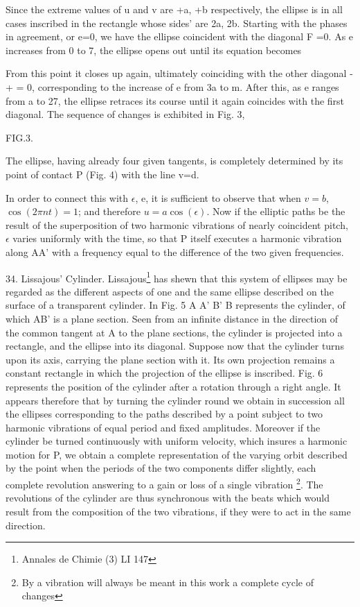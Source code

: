 Since the extreme values of u and v are +a, +b respectively, the ellipse is in
all cases inscribed in the rectangle whose sides' are 2a, 2b.  Starting with
the phases in agreement, or e=0, we have the ellipse coincident with the
diagonal F =0. As e increases from 0 to 7, the ellipse opens out until its equation becomes

From this point it closes up again, ultimately coinciding with the other
diagonal - + = 0, corresponding to the increase of e from 3a to m.  After this,
as e ranges from a to 27, the ellipse retraces its course until it again
coincides with the first diagonal. The sequence of changes is exhibited in Fig.  3,

FIG.3.

The ellipse, having already four given tangents, is completely determined by
its point of contact P (Fig. 4) with the line v=d.

In order to connect this with \(\epsilon\), e, it is sufficient to observe that
when \(v=b\), \(\cos(2 \pi nt) =1\); and therefore \(u=a \cos(\epsilon)\). Now
if the elliptic paths be the result of the superposition of two harmonic
vibrations of nearly coincident pitch, \(\epsilon\) varies uniformly with the
time, so that P itself executes a harmonic vibration along AA' with a frequency
equal to the difference of the two given frequencies.

34.  Lissajous’ Cylinder. Lissajous\footnote{Annales de Chimie (3) LI  147}
has shewn that this system of ellipses may be regarded as the different aspects
of one and the same ellipse described on the surface of a transparent cylinder.
In Fig. 5 A A' B' B represents the cylinder, of which AB' is a plane section.
Seen from an infinite distance in the direction of the common tangent at A to
the plane sections, the cylinder is projected into a rectangle, and the ellipse
into its diagonal. Suppose now that the cylinder turns upon its axis, carrying
the plane section with it. Its own projection remains a constant rectangle in
which the projection of the ellipse is inscribed. Fig. 6 represents the
position of the cylinder after a rotation through a right angle. It appears
therefore that by turning the cylinder round we obtain in succession all the
ellipses corresponding to the paths described by a point subject to two
harmonic vibrations of equal period and fixed amplitudes. Moreover if the
cylinder be turned continuously with uniform velocity, which insures a harmonic
motion for P, we obtain a complete representation of the varying orbit
described by the point when the periods of the two components differ slightly,
each complete revolution answering to a gain or loss of a single vibration
\footnote{By a vibration will always be meant in this work a complete cycle of
changes}. The revolutions of the cylinder are thus synchronous with the beats
which would result from the composition of the two vibrations, if they were to
act in the same direction.

